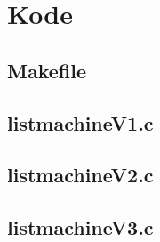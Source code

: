 \chapter{Kode}
\section{Makefile}
\label{Code_make}

\clearpage
\section{listmachineV1.c}
\label{Code_V1}

\clearpage
\section{listmachineV2.c}
\label{Code_V2}

\clearpage
\section{listmachineV3.c}
\label{Code_V3}

\clearpage